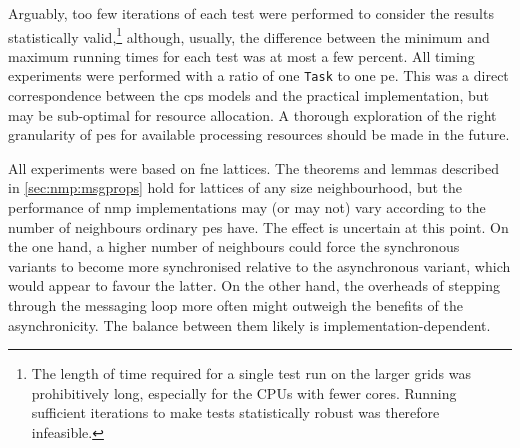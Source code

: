 Arguably, too few iterations of each test were performed to consider the results statistically valid,\footnote{The length of time required for a single test run on the larger grids was prohibitively long, especially for the CPUs with fewer cores.  Running sufficient iterations to make tests statistically robust was therefore infeasible.} although, usually, the difference between the minimum and maximum running times for each test was at most a few percent.  All timing experiments were performed with a ratio of one \texttt{Task} to one \gls{pe}.  This was a direct correspondence between the \gls{cps} models and the practical implementation, but may be sub-optimal for resource allocation.  A thorough exploration of the right granularity of \glspl{pe} for available processing resources should be made in the future.

All experiments were based on \gls{fne} lattices.  The theorems and lemmas described in \cref{sec:nmp:msgprops} hold for lattices of any size neighbourhood, but the performance of \gls{nmp} implementations may (or may not) vary according to the number of neighbours ordinary \glspl{pe} have.  The effect is uncertain at this point.  On the one hand, a higher number of neighbours could force the synchronous variants to become more synchronised relative to the asynchronous variant, which would appear to favour the latter.  On the other hand, the overheads of stepping through the messaging loop more often might outweigh the benefits of the asynchronicity.  The balance between them likely is implementation-dependent.